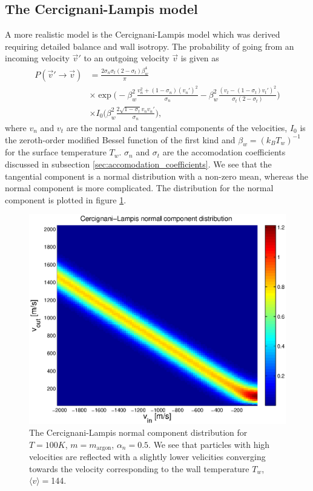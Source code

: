 \subsection{The Cercignani-Lampis model}
A more realistic model is the Cercignani-Lampis model which was derived requiring detailed balance and wall isotropy\cite{cowling1974cercignani}. The probability of going from an incoming velocity $\vec v'$ to an outgoing velocity $\vec v$ is given as
\begin{align}
	\nonumber
	P(\vec v'\rightarrow \vec v) &= \frac{2\sigma_n\sigma_t(2-\sigma_t)\beta_w^4}{\pi}\\
	\nonumber
	&\times\exp\Big(-\beta_w^2\frac{v_n^2 + (1-\sigma_n)(v_n')^2}{\sigma_n} - \beta_w^2\frac{(v_t - (1 - \sigma_t)v_t')^2}{\sigma_t(2 - \sigma_t)}\Big)\\
	&\times I_0\Big(\beta_w^2\frac{2\sqrt{1 - \sigma_t}v_nv_n'}{\sigma_n}\Big),
\end{align}
where $v_n$ and $v_t$ are the normal and tangential components of the velocities, $I_0$ is the zeroth-order modified Bessel function of the first kind and $\beta_w = (k_BT_w)^{-1}$ for the surface temperature $T_w$. $\sigma_n$ and $\sigma_t$ are the accomodation coefficients discussed in subsection \ref{sec:accomodation_coefficients}. We see that the tangential component is a normal distribution with a non-zero mean, whereas the normal component is more complicated. The distribution for the normal component is plotted in figure \ref{fig:cercignani_lampis}.
\begin{figure}[h]
\begin{center}
\includegraphics[width=\textwidth, trim=0cm 0cm 0cm 0cm, clip]{DSMC/figures/cercignani-lampis.eps}
\end{center}
\caption{The Cercignani-Lampis normal component distribution for $T=100K$, $m=m_{\text{argon}}$, $\alpha_n=0.5$. We see that particles with high velocities are reflected with a slightly lower velicities converging towards the velocity corresponding to the wall temperature $T_w$, $\langle v \rangle = $\unit{144}{\meter\per\second}.}
\label{fig:cercignani_lampis}
\end{figure}

